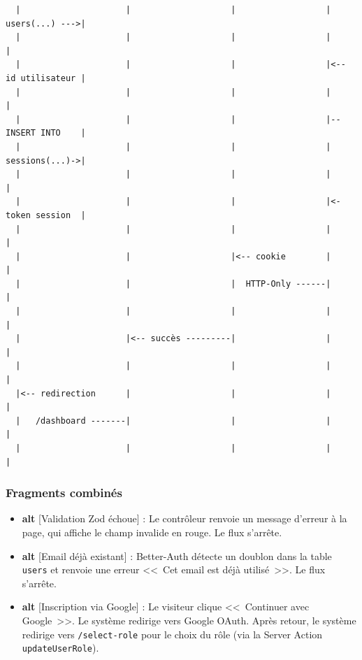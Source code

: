 \documentclass[12pt,a4paper]{article}
\begin{document}
\begin{tcolorbox}[colback=white,colframe=black!50,title=DS-01 — Inscription d'un utilisateur]
\begin{verbatim}
  |                     |                    |                  |   users(...) --->|
  |                     |                    |                  |                  |
  |                     |                    |                  |<-- id utilisateur |
  |                     |                    |                  |                  |
  |                     |                    |                  |-- INSERT INTO    |
  |                     |                    |                  |   sessions(...)->|
  |                     |                    |                  |                  |
  |                     |                    |                  |<- token session  |
  |                     |                    |                  |                  |
  |                     |                    |<-- cookie        |                  |
  |                     |                    |  HTTP-Only ------|                  |
  |                     |                    |                  |                  |
  |                     |<-- succès ---------|                  |                  |
  |                     |                    |                  |                  |
  |<-- redirection      |                    |                  |                  |
  |   /dashboard -------|                    |                  |                  |
  |                     |                    |                  |                  |
\end{verbatim}
\end{tcolorbox}

\subsubsection{Fragments combinés}

\begin{itemize}
    \item \textbf{alt} [Validation Zod échoue] : Le contrôleur renvoie un message d'erreur à la page, qui affiche le champ invalide en rouge. Le flux s'arrête.
    \item \textbf{alt} [Email déjà existant] : Better-Auth détecte un doublon dans la table \texttt{users} et renvoie une erreur <<~Cet email est déjà utilisé~>>. Le flux s'arrête.
    \item \textbf{alt} [Inscription via Google] : Le visiteur clique <<~Continuer avec Google~>>. Le système redirige vers Google OAuth. Après retour, le système redirige vers \texttt{/select-role} pour le choix du rôle (via la Server Action \texttt{updateUserRole}).
\end{itemize}
\end{document}

